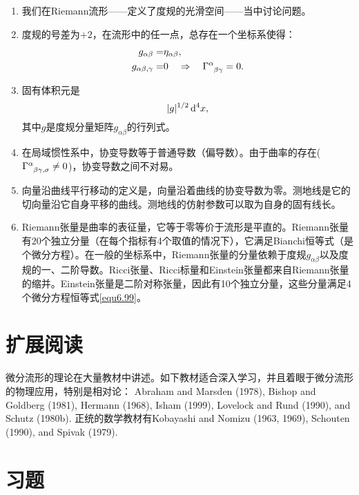 \begin{enumerate}
    \item 我们在Riemann流形——定义了度规的光滑空间——当中讨论问题。
    \item 度规的号差为$+2$，在流形中的任一点，总存在一个坐标系使得：
    \begin{align*}
        g_{\alpha \beta} =& \eta_{\alpha \beta}, \\
        g_{\alpha \beta, \gamma} =& 0 \quad \Rightarrow \quad \Gamma\indices{^\alpha_{\beta \gamma}} = 0.
    \end{align*}
    \item 固有体积元是
    \[
        |g|^{1/2} \, \mathrm{d}^4 x,    
    \]
    其中$g$是度规分量矩阵$g_{\alpha \beta}$的行列式。
    \item 在局域惯性系中，协变导数等于普通导数（偏导数）。由于曲率的存在($\Gamma\indices{^\alpha_{\beta \gamma, \sigma}} \neq 0$)，协变导数之间不对易。
    \item 向量沿曲线平行移动的定义是，向量沿着曲线的协变导数为零。测地线是它的切向量沿它自身平移的曲线。测地线的仿射参数可以取为自身的固有线长。
    \item Riemann张量是曲率的表征量，它等于零等价于流形是平直的。Riemann张量有$20$个独立分量（在每个指标有4个取值的情况下），它满足Bianchi恒等式（是个微分方程）。在一般的坐标系中，Riemann张量的分量依赖于度规$g_{\alpha \beta}$以及度规的一、二阶导数。Ricci张量、Ricci标量和Einstein张量都来自Riemann张量的缩并。Einstein张量是二阶对称张量，因此有10个独立分量，这些分量满足4个微分方程恒等式\eqref{equ6.99}。
\end{enumerate}

\section{扩展阅读}
\label{sec6.8}
微分流形的理论在大量教材中讲述。如下教材适合深入学习，并且着眼于微分流形的物理应用，特别是相对论： Abraham and Marsden (1978), Bishop and Goldberg (1981), Hermann (1968), Isham (1999), Lovelock and Rund (1990), and Schutz (1980b). 正统的数学教材有Kobayashi and Nomizu (1963, 1969), Schouten (1990), and Spivak (1979).

\section{习题}
\label{sec6.9}